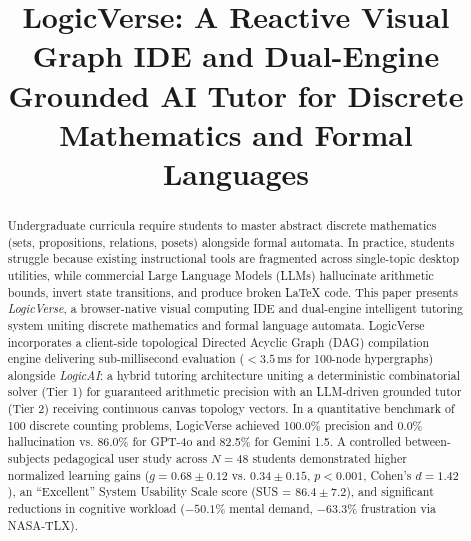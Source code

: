 \documentclass[conference]{IEEEtran}
\begin{document}
\title{LogicVerse: A Reactive Visual Graph IDE and Dual-Engine Grounded AI Tutor for Discrete Mathematics and Formal Languages}

\author{
\and
{}
}

\maketitle

\begin{abstract}
Undergraduate curricula require students to master abstract discrete mathematics (sets, propositions, relations, posets) alongside formal automata. In practice, students struggle because existing instructional tools are fragmented across single-topic desktop utilities, while commercial Large Language Models (LLMs) hallucinate arithmetic bounds, invert state transitions, and produce broken \LaTeX{} code. This paper presents \textit{LogicVerse}, a browser-native visual computing IDE and dual-engine intelligent tutoring system uniting discrete mathematics and formal language automata. LogicVerse incorporates a client-side topological Directed Acyclic Graph (DAG) compilation engine delivering sub-millisecond evaluation ($< 3.5$\,ms for 100-node hypergraphs) alongside \textit{LogicAI}: a hybrid tutoring architecture uniting a deterministic combinatorial solver (Tier 1) for guaranteed arithmetic precision with an LLM-driven grounded tutor (Tier 2) receiving continuous canvas topology vectors. In a quantitative benchmark of 100 discrete counting problems, LogicVerse achieved 100.0\% precision and 0.0\% hallucination vs. 86.0\% for GPT-4o and 82.5\% for Gemini 1.5. A controlled between-subjects pedagogical user study across $N = 48$ students demonstrated higher normalized learning gains ($g = 0.68 \pm 0.12$ vs. $0.34 \pm 0.15$, $p < 0.001$, Cohen's $d = 1.42$), an ``Excellent'' System Usability Scale score (SUS = $86.4 \pm 7.2$), and significant reductions in cognitive workload ($-50.1\%$ mental demand, $-63.3\%$ frustration via NASA-TLX).
\end{abstract}
\end{document}
